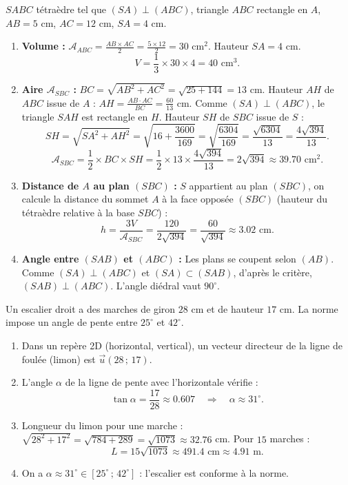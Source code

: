 \documentclass[11pt]{article}
\newcommand{\cle}[1]{{\popxbold\color{popdark}#1}}
\begin{document}
\begin{corrige}
$SABC$ tétraèdre tel que $(SA) \perp (ABC)$, triangle $ABC$ rectangle en $A$, $AB=5$ cm, $AC=12$ cm, $SA=4$ cm.
\begin{enumerate}
\item \textbf{Volume :} $\mathcal{A}_{ABC} = \frac{AB\times AC}{2} = \frac{5\times 12}{2} = 30$ cm$^2$. Hauteur $SA = 4$ cm.
\[ V = \frac{1}{3}\times 30 \times 4 = 40 \text{ cm}^3. \]
\item \textbf{Aire $\mathcal{A}_{SBC}$ :} $BC = \sqrt{AB^2+AC^2} = \sqrt{25+144} = 13$ cm. Hauteur $AH$ de $ABC$ issue de $A$ : $AH = \frac{AB\cdot AC}{BC} = \frac{60}{13}$ cm. Comme $(SA)\perp(ABC)$, le triangle $SAH$ est rectangle en $H$. Hauteur $SH$ de $SBC$ issue de $S$ :
\[ SH = \sqrt{SA^2 + AH^2} = \sqrt{16 + \frac{3600}{169}} = \sqrt{\frac{6304}{169}} = \frac{\sqrt{6304}}{13} = \frac{4\sqrt{394}}{13}. \]
\[ \mathcal{A}_{SBC} = \frac{1}{2}\times BC \times SH = \frac{1}{2}\times 13 \times \frac{4\sqrt{394}}{13} = 2\sqrt{394} \approx \num{39,70} \text{ cm}^2. \]
\item \textbf{Distance de $A$ au plan $(SBC)$ :} $S$ appartient au plan $(SBC)$, on calcule la distance du sommet $A$ à la face opposée $(SBC)$ (hauteur du tétraèdre relative à la base $SBC$) :
\[ h = \frac{3V}{\mathcal{A}_{SBC}} = \frac{120}{2\sqrt{394}} = \frac{60}{\sqrt{394}} \approx \num{3,02} \text{ cm}. \]
\item \textbf{Angle entre $(SAB)$ et $(ABC)$ :} Les plans se coupent selon $(AB)$. Comme $(SA)\perp(ABC)$ et $(SA)\subset(SAB)$, d'après le critère, $(SAB)\perp(ABC)$. L'angle diédral vaut $90^\circ$.
\end{enumerate}
\end{corrige}

\begin{corrige}
Un escalier droit a des marches de giron $28$ cm et de hauteur $17$ cm. La norme impose un angle de pente entre $25^\circ$ et $42^\circ$.
\begin{enumerate}
\item Dans un repère 2D (horizontal, vertical), un vecteur directeur de la ligne de foulée (limon) est $\vec{u}(28\,;\,17)$.
\item L'angle $\alpha$ de la ligne de pente avec l'horizontale vérifie :
\[ \tan\alpha = \frac{17}{28} \approx \num{0,607} \quad\Rightarrow\quad \alpha \approx 31^\circ. \]
\item Longueur du limon pour une marche : $\sqrt{28^2+17^2} = \sqrt{784+289} = \sqrt{1073} \approx \num{32,76}$ cm. Pour $15$ marches :
\[ L = 15\sqrt{1073} \approx \num{491,4} \text{ cm} \approx \num{4,91} \text{ m}. \]
\item On a $\alpha \approx 31^\circ \in [25^\circ\,;\,42^\circ]$ : l'escalier est \cle{conforme} à la norme.
\end{enumerate}
\end{corrige}
\end{document}
